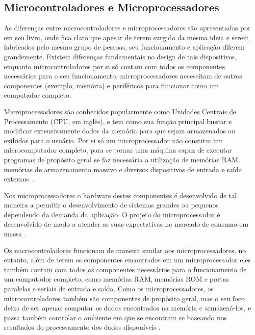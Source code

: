 

\subsection{Microcontroladores e Microprocessadores}%

As diferenças entre microcontroladores e microprocessadores são apresentadas por  em seu livro, onde fica claro que apesar de terem surgido da mesma ideia e serem fabricados pelo mesmo grupo de pessoas, seu funcionamento e aplicação diferem grandemente. Existem diferenças fundamentais no design de tais dispositivos, enquanto microcontroladores por si só contam com todos os componentes necessários para o seu funcionamento, microprocessadores necessitam de outros componentes (exemplo, memória) e periféricos para funcionar como um computador completo.

Microprocessadores são conhecidos popularmente como Unidades Centrais de Processamento (CPU, em inglês), e tem como sua função principal buscar e modificar extensivamente dados da memória para que sejam armazenados ou exibidos para o usuário. Por si só um microprocessador não constitui um microcomputador completo, para se tornar uma máquina capaz de executar programas de propósito geral se faz necessária a utilização de memórias RAM, memórias de armazenamento massivo e diversos dispositivos de entrada e saída externos~\cite{ayala:1991}.

Nos microprocessadores o hardware destes componentes é desenvolvido de tal maneira a permitir o desenvolvimento de sistemas grandes ou pequenos dependendo da demanda da aplicação. O projeto do microprocessador é desenvolvido de modo a atender as suas expectativas no mercado de consumo em massa  \cite{ayala:1991}.

Os microcontroladores funcionam de maneira similar aos microprocessadores, no entanto, além de terem os componentes encontrados em um microprocessador eles também contam com todos os componentes necessários para o funcionamento de um computador completo, como memórias RAM, memórias ROM e portas paralelas e seriais de entrada e saída. Como os microprocessadores, os microcontroladores também são componentes de propósito geral, mas o seu foco deixa de ser apenas computar os dados encontrados na memória e armazená-los, e passa também controlar o ambiente em que se encontram se baseando nos resultados do processamento dos dados disponíveis \cite{ayala:1991}.

